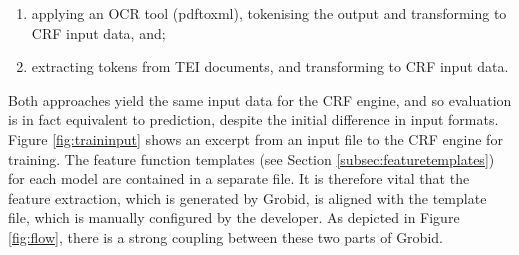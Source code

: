 \begin{enumerate}
\item applying an OCR tool (pdftoxml), tokenising the output and transforming to CRF input data, and;
\item extracting tokens from TEI documents, and transforming to CRF input data.
\end{enumerate}

Both approaches yield the same input data for the CRF engine, and so evaluation is in fact equivalent to prediction, despite the initial difference in input formats. Figure \ref{fig:traininput} shows an excerpt from an input file to the CRF engine for training. The feature function templates (see Section \ref{subsec:featuretemplates}) for each model are contained in a separate file. It is therefore vital that the feature extraction, which is generated by Grobid, is aligned with the template file, which is manually configured by the developer. As depicted in Figure \ref{fig:flow}, there is a strong coupling between these two parts of Grobid.

